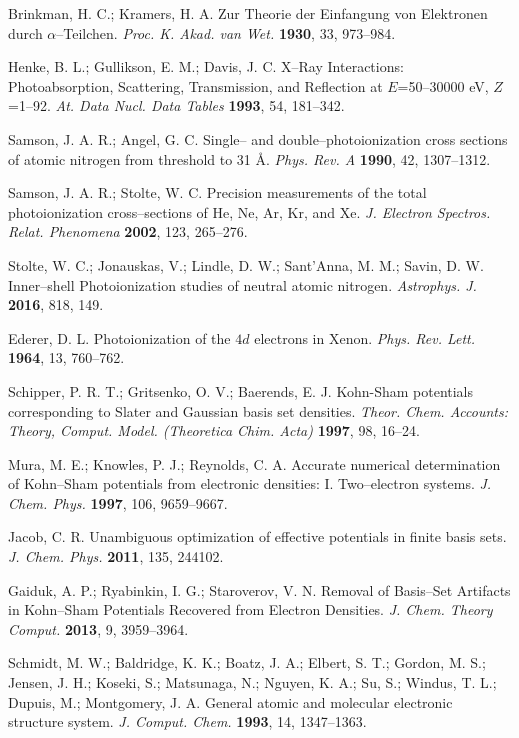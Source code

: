 \documentclass[10pt]{article}
\providecommand{\DIFaddend}{} %
\begin{document}
\begin{thebibliography}{10}
\DIFaddend {}
Brinkman, H. C.; Kramers, H. A.
Zur Theorie der Einfangung von Elektronen durch $\alpha$--Teilchen.
{\it Proc. K. Akad. van Wet.} {\bf 1930}, 33, 973--984.

Henke, B. L.; Gullikson, E. M.; Davis, J. C. 
X--Ray Interactions: Photoabsorption, Scattering, Transmission, and Reflection at $E$=50--30000 eV, $Z$=1--92.
{\it At. Data Nucl. Data Tables} {\bf 1993}, 54, 181--342.

Samson, J. A. R.; Angel, G. C.
Single-- and double--photoionization cross sections of atomic nitrogen from threshold to 31 \AA.
{\it Phys. Rev. A} {\bf 1990}, 42, 1307--1312.

Samson, J. A. R.; Stolte, W. C.
Precision measurements of the total photoionization cross--sections of He, Ne, Ar, Kr, and Xe.
{\it J. Electron Spectros. Relat. Phenomena} {\bf 2002}, 123, 265--276.

Stolte, W. C.; Jonauskas, V.; Lindle, D. W.; Sant'Anna, M. M.; Savin, D. W. 
Inner--shell Photoionization studies of neutral atomic nitrogen.
{\it Astrophys. J.} {\bf 2016}, 818, 149.

Ederer, D. L. 
Photoionization of the $4d$ electrons in Xenon.
{\it Phys. Rev. Lett.} {\bf 1964}, 13, 760--762.

Schipper, P. R. T.; Gritsenko, O. V.; Baerends, E. J. 
Kohn-Sham potentials corresponding to Slater and Gaussian basis set densities.
{\it Theor. Chem. Accounts: Theory, Comput. Model. (Theoretica Chim. Acta)} {\bf 1997}, 98, 16--24.

Mura, M. E.; Knowles, P. J.; Reynolds, C. A.
Accurate numerical determination of Kohn--Sham potentials from electronic densities: I. Two--electron systems.
{\it J. Chem. Phys.} {\bf 1997}, 106, 9659--9667.

Jacob, C. R. 
Unambiguous optimization of effective potentials in finite basis sets.
{\it J. Chem. Phys.} {\bf 2011}, 135, 244102.

Gaiduk, A. P.; Ryabinkin, I. G.; Staroverov, V. N.
Removal of Basis--Set Artifacts in Kohn--Sham Potentials Recovered from Electron Densities.
{\it J. Chem. Theory Comput.} {\bf 2013}, 9, 3959--3964.

Schmidt, M. W.; Baldridge, K. K.; Boatz, J. A.; Elbert, S. T.; Gordon, M. S.; Jensen, J. H.; Koseki, S.;
Matsunaga, N.; Nguyen, K. A.; Su, S.; Windus, T. L.; Dupuis, M.; Montgomery, J. A.
General atomic and molecular electronic structure system.
{\it J. Comput. Chem.} {\bf 1993}, 14, 1347--1363.


\end{thebibliography}
\end{document}
